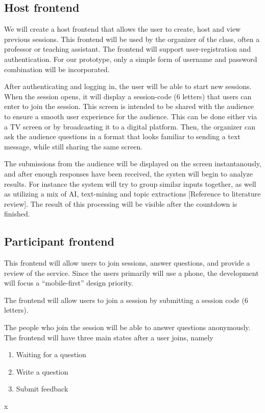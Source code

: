 \subsection{Host frontend}
We will create a host frontend that allows the user to create, host and view previous sessions. This frontend will be used by the organizer of the class, often a professor or teaching assistant. The frontend will support user-registration and authentication. For our prototype, only a simple form of username and password combination will be incorporated.

After authenticating and logging in, the user will be able to start new sessions. When the session opens, it will display a session-code (6 letters) that users can enter to join the session. This screen is intended to be shared with the audience to ensure a smooth user experience for the audience. This can be done either via a TV screen or by broadcasting it to a digital platform. Then, the organizer can ask the audience questions in a format that looks familiar to sending a text message, while still sharing the same screen. 

The submissions from the audience will be displayed on the screen instantanously, and after enough responses have been received, the systen will begin to analyze results. For instance the system will try to group similar inputs together, as well as utilizing a mix of AI, text-mining and topic extractions [Reference to literature review]. The result of this processing will be visible after the countdown is finished.


\subsection{Participant frontend}
This frontend will allow users to join sessions, answer questions, and provide a review of the service. Since the users primarily will use a phone, the development will focus a “mobile-first” design priority. 

The frontend will allow users to join a session by submitting a session code (6 letters).

The people who join the session will be able to answer questions anonymously. The frontend will have three main states after a user joins, namely 

\begin{enumerate}
    \item Waiting for a question
    \item Write a question
    \item Submit feedback
\end{enumerate}
x

